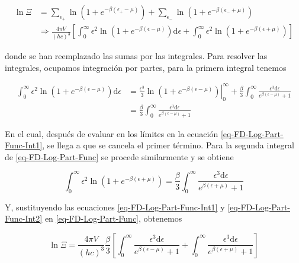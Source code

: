 \begin{equation}\label{eq-FD-Log-Part-Func}
\begin{split}
\ln \Xi &= \sum_{{\epsilon}_{+}} \ln \left(1+{e}^{-\beta({\epsilon}_{+}-\mu)} \right) + \sum_{{\epsilon}_{-}} \ln \left(1+{e}^{-\beta({\epsilon}_{-}+\mu)} \right) \\ 
& \Rightarrow \frac{4 \pi V}{(hc)^{3}} \left[ \int_{0}^{\infty} {\epsilon}^{2} \ln \left(1 + {e}^{-\beta(\epsilon - \mu)} \right) \mathrm{d}\epsilon + \int_{0}^{\infty} {\epsilon}^{2} \ln \left(1 + {e}^{-\beta(\epsilon + \mu)} \right) \right]
\end{split}
\end{equation}

donde se han reemplazado las sumas por las integrales. Para resolver las integrales, ocupamos integración por partes, para la primera integral tenemos

\begin{equation}\label{eq-FD-Log-Part-Func-Int1}
\begin{split}
\int_{0}^{\infty} {\epsilon}^{2} \ln \left(1 + {e}^{-\beta(\epsilon-\mu)} \right) \mathrm{d} \epsilon & = \left. \frac{{\epsilon}^{3}}{3} \ln \left(1+{e}^{-\beta(\epsilon-\mu)} \right) \right|_{0}^{\infty} + \frac{\beta}{3} \int_{0}^{\infty} \frac{ {\epsilon}^{3} \mathrm{d} \epsilon}{{e}^{\beta(\epsilon - \mu)} + 1} \\
& = \frac{\beta}{3} \int_{0}^{\infty} \frac{{\epsilon}^{3} \mathrm{d} \epsilon}{{e}^{\beta (\epsilon - \mu)} + 1 }
\end{split}
\end{equation}

En el cual, después de evaluar en los límites en la ecuación \eqref{eq-FD-Log-Part-Func-Int1}, se llega a que se cancela el primer término. Para la segunda integral de \eqref{eq-FD-Log-Part-Func} se procede similarmente y se obtiene

\begin{equation}\label{eq-FD-Log-Part-Func-Int2}
\int_{0}^{\infty} {\epsilon}^{2} \ln \left(1 + {e}^{-\beta(\epsilon + \mu)} \right) = \frac{\beta}{3} \int_{0}^{\infty} \frac{{\epsilon}^{3} \mathrm{d} \epsilon}{{e}^{\beta (\epsilon + \mu)} + 1 }
\end{equation}

Y, sustituyendo las ecuaciones \eqref{eq-FD-Log-Part-Func-Int1} y  \eqref{eq-FD-Log-Part-Func-Int2} en \eqref{eq-FD-Log-Part-Func}, obtenemos 

\begin{equation}
\ln \Xi = \frac{4\pi V }{(hc)^{3}} \frac{\beta}{3} \left[\int_{0}^{\infty} \frac{{\epsilon}^{3} \mathrm{d} \epsilon}{{e}^{\beta (\epsilon - \mu)} + 1 } + \int_{0}^{\infty} \frac{{\epsilon}^{3} \mathrm{d} \epsilon}{{e}^{\beta (\epsilon + \mu)} + 1 }\right]
\end{equation}

